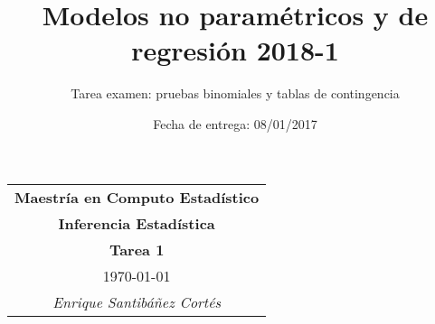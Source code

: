 \documentclass[11pt,letterpaper]{article}
\title{Modelos no paramétricos y de regresión 2018-1}
\author{Tarea examen: pruebas binomiales y tablas de contingencia}
\date{Fecha de entrega: 08/01/2017}
\begin{document}
\begin{table}[ht]
\centering
\begin{tabular}{c}
\textbf{Maestría en Computo Estadístico}\\
\textbf{Inferencia Estadística} \\
\textbf{Tarea 1}\\
\today \\
\emph{Enrique Santibáñez Cortés}
\end{tabular}
\end{table}
\end{document}
